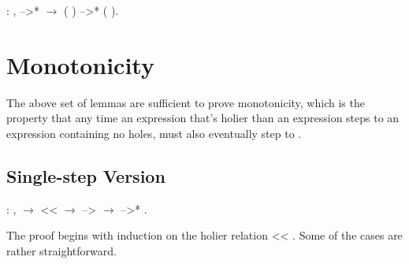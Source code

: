 \documentclass[12pt]{report}
\begin{document}
\begin{coqdoccode}
\coqdocemptyline
\coqdocindent{1.00em}
  : \coqdockw{\ensuremath{\forall}}   ,\coqdoceol
\coqdocindent{2.00em}
 -->*  \ensuremath{\rightarrow}\coqdoceol
\coqdocindent{2.00em}
(  ) -->* (  ).\coqdoceol
\coqdocemptyline
\end{coqdoccode}
\section{Monotonicity}



 The above set of lemmas are sufficient to prove
monotonicity, which is the property that any time an expression 
that's holier than an expression  steps to an expression 
containing no holes,  must also eventually step to . 

\subsection{Single-step Version}

\begin{coqdoccode}
\coqdocemptyline
\coqdocindent{1.00em}
  : \coqdockw{\ensuremath{\forall}}   ,\coqdoceol
\coqdocindent{2.00em}
  \ensuremath{\rightarrow}\coqdoceol
\coqdocindent{2.00em}
 <<  \ensuremath{\rightarrow}\coqdoceol
\coqdocindent{2.00em}
 -->  \ensuremath{\rightarrow}\coqdoceol
\coqdocindent{2.00em}
 -->* .\coqdoceol
\coqdocemptyline
\end{coqdoccode}
The proof begins with induction on the holier relation  <<
. Some of the cases are rather straightforward. 
\end{document}

